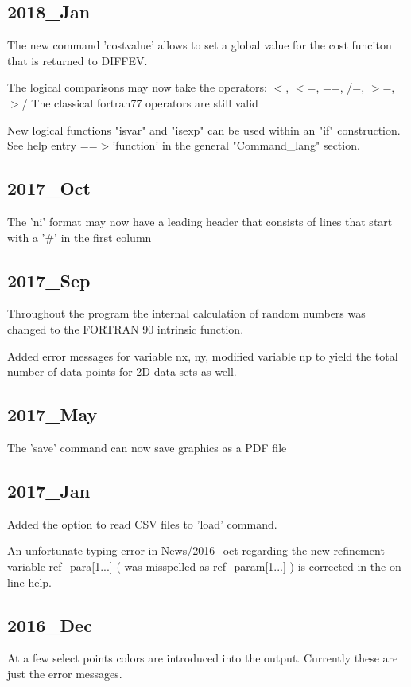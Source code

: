 \subsection*{2018\_Jan}
\par
The new command 'costvalue' allows to set a global value 
for the cost funciton that is returned to DIFFEV. 
\par
The logical comparisons may now take the operators: 
$ <$, $ <$=, ==, /=, $> $=, $> $/ 
The classical fortran77 operators are still valid 
\par
New logical functions "isvar" and "isexp" can be used within an 
"if" construction. See help entry ==$> $'function' in the 
general "Command\_lang" section. 
\subsection*{2017\_Oct}
\par
The 'ni' format may now have a leading header that consists of 
lines that start with a '\#' in the first column 
\subsection*{2017\_Sep}
\par
Throughout the program the internal calculation of random numbers 
was changed to the FORTRAN 90 intrinsic function. 
\par
Added error messages for variable nx, ny, modified variable np to 
yield the total number of data points for 2D data sets as well. 
\subsection*{2017\_May}
\par
The 'save' command can now save graphics as a PDF file 
\subsection*{2017\_Jan}
\par
Added the option to read CSV files to 'load' command. 
\par
An unfortunate typing error in News/2016\_oct regarding the new 
refinement variable 
ref\_para[1...]   ( was misspelled as ref\_param[1...] ) 
is corrected in the  on-line help. 
\subsection*{2016\_Dec}
\par
At a few select points colors are introduced into the output. 
Currently these are just the error messages. 
\par
